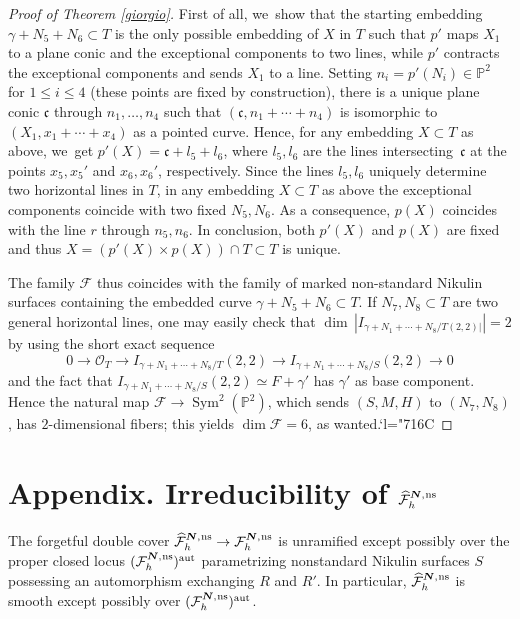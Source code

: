 \documentclass[JEP,XML,SOM,Unicode,NoEqCountersInSection,published]{cedram}
\newcommand{\Changelback}{\mathcode`l="716C}
\newcommand{\aut}{{\mathrm{aut}}}
\newcommand{\ns}{{\mkern1mu\mathrm{ns}}}
\newcommand{\bN}{\boldsymbol{N}}
\theoremstyle{plain}
\theoremstyle{definition}
\DeclareMathOperator{\Sym}{Sym}
\newcommand\PP{{\mathbb P}}
\newcommand\F{{\mathcal F}}
\renewcommand\O{{\mathcal O}}
\begin{document}
\begin{proof}[Proof of Theorem \ref{giorgio}]
First of all, we~show that the starting embedding $\gamma+N_5+N_6\subset T$ is the only possible embedding of $X$ in $T$ such that $p'$ maps $X_1$ to a plane conic and the exceptional components to two lines, while $p'$ contracts the exceptional components and sends $X_1$ to a line. Setting $n_i=p'(N_i)\in\PP^2$ for $1\leq i\leq 4$ (these points are fixed by construction), there is a unique plane conic $\mathfrak c$ through $n_1,\ldots, n_4$ such that $(\mathfrak c,n_1+\cdots+n_4)$ is isomorphic to $(X_1,x_1+\cdots+x_4)$ as a pointed curve. Hence, for any embedding $X\subset T$ as above, we~get $p'(X)=\mathfrak c+l_5+l_6$, where $l_5,l_6$ are the lines intersecting~$\mathfrak c$ at the points $x_5,x_5'$ and $x_6,x_6'$, respectively. Since the lines $l_5,l_6$ uniquely determine two horizontal lines in $T$, in any embedding $X\subset T$ as above the exceptional components coincide with two fixed $N_5,N_6$. As a consequence, $p(X)$ coincides with the line $r$ through $n_5,n_6$. In conclusion, both $p'(X)$ and $p(X)$ are fixed and thus $X=(p'(X)\times p(X))\cap T\subset T$ is unique.

The family $\F$ thus coincides with the family of marked non-standard Nikulin surfaces containing the embedded curve $\gamma+N_5+N_6\subset T$. If $N_7,N_8\subset T$ are two general horizontal lines, one may easily check that $\dim\,|I_{\gamma+N_1+\cdots+N_8/T(2,2)|}|=2$ by using the short exact sequence\vspace*{-3pt}
\[
0\to \O_T\to I_{\gamma+N_1+\cdots+N_8/T}(2,2)\to I_{\gamma+N_1+\cdots+N_8/S}(2,2)\to 0
\]
and the fact that $I_{\gamma+N_1+\cdots+N_8/S}(2,2)\simeq F+\gamma'$ has $\gamma'$ as base component. Hence the natural map $\F\to \Sym^2(\mathbb P^2)$, which sends $(S,M,H)$ to $(N_7,N_8)$, has $2$-dimensional fibers; this yields $\dim\F=6$, as wanted.\Changelback
\end{proof}

\appendix

\section*{Appendix. Irreducibility of \texorpdfstring{$\widehat{\F}_h^{\bN,\ns}$}{F}}

The forgetful double cover $\widehat{\F}_h^{\bN,\ns} \to \F_h^{\bN,\ns}$ is unramified except possibly over the proper closed locus $(\F_h^{\bN,\ns})^\aut$ parametrizing nonstandard Nikulin surfaces $S$ \hbox{possessing} an automorphism exchanging $R$ and $R'$. In particular, $\widehat{\F}_h^{\bN,\ns}$ is
smooth except possibly over $(\F_h^{\bN,\ns})^\aut$.
\end{document}
